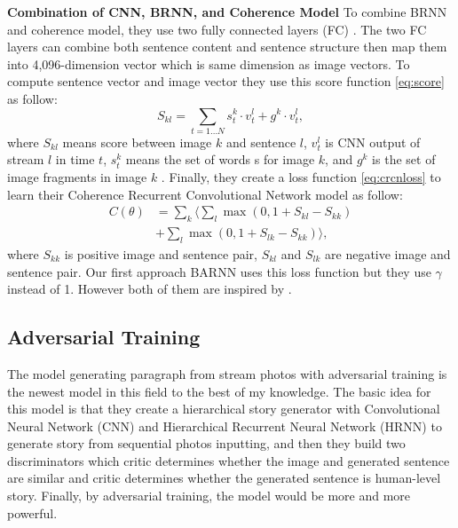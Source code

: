 \documentclass[11pt]{article}
\begin{document}
{\bf  Combination of CNN, BRNN, and Coherence Model} To combine BRNN and coherence model, they use two fully connected layers (FC) \cite{Barzilay:2008:MLC:1350986.1350987}. The two FC layers can combine both sentence content and sentence structure then map them into 4,096-dimension vector which is same dimension as image vectors. To compute sentence vector and image vector they use this score function \ref{eq:score}  \cite{Karpathy_2015_CVPR} as follow:
\begin{equation}
S_{kl} = \sum_{t = 1 \ldots N} s_{t}^{k} \cdot v_{t}^{l} + g^{k} \cdot v_{t}^{l},
\label{eq:score}
\end{equation}
where $S_{kl}$ means score between image $k$ and sentence $l$, $v_{t}^{l}$ is CNN output of stream $l$ in time $t$, $s_{t}^{k}$ means the set of words s for image $k$, and $g^{k}$ is the set of image fragments in image $k$ \cite{Karpathy:2014:DFE:2969033.2969038}. Finally, they create a loss function \ref{eq:crcnloss} to learn their Coherence Recurrent Convolutional Network model as follow:
\begin{equation}
\begin{aligned}
C(\theta) &= \sum_k \langle \sum_l \max (0, 1 + S_{kl} - S_{kk}) \\
&+ \sum_l \max (0, 1 + S_{lk} - S_{kk})\rangle,
\end{aligned}
\label{eq:crcnloss}
\end{equation}
where $S_{kk}$ is positive image and sentence pair, $S_{kl}$ and $S_{lk}$ are negative image and sentence pair. Our first approach BARNN uses this loss function but they use $\gamma$ instead of 1. However both of them are inspired by \cite{Karpathy:2014:DFE:2969033.2969038}. 

\subsection{Adversarial Training}

The model generating paragraph from stream photos with adversarial training is the newest model in this field to the best of my knowledge. The basic idea for this model is that they create a hierarchical story generator with Convolutional Neural Network (CNN) and Hierarchical Recurrent Neural Network (HRNN) to generate story from sequential photos inputting, and then they build two discriminators which critic determines whether the image and generated sentence are similar and critic determines whether the generated sentence is human-level story. Finally, by adversarial training, the model would be more and more powerful.
\end{document}
